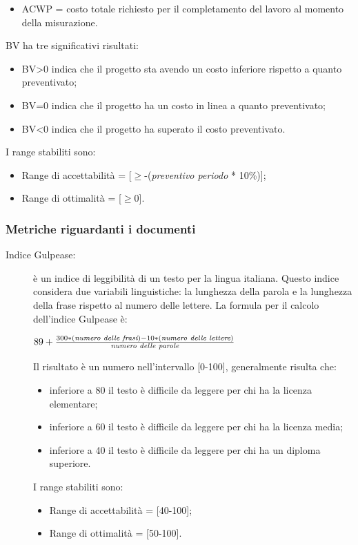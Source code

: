 \begin{description}
\begin{itemize}
        \item ACWP = costo totale richiesto per il completamento del lavoro al momento della misurazione.
      \end{itemize}
      BV ha tre significativi risultati:
      \begin{itemize}
        \item BV>0 indica che il progetto sta avendo un costo inferiore rispetto a quanto preventivato;
        \item BV=0 indica che il progetto ha un costo in linea a quanto preventivato;
        \item BV<0 indica che il progetto ha superato il costo preventivato.
      \end{itemize}
      I range stabiliti sono:
      \begin{itemize}
        \item Range di accettabilità = [\(\geq\)-(\emph{preventivo periodo} * 10\%)];
        \item Range di ottimalità = [\(\geq\)0].
      \end{itemize}
    \end{description}
    \subsubsection{Metriche riguardanti i documenti}
    \begin{description}
      \item[Indice Gulpease:] è un indice di leggibilità di un testo per la lingua italiana.
      Questo indice considera due variabili linguistiche: la lunghezza della parola e la lunghezza della frase rispetto al numero delle lettere.
      La formula per il calcolo dell'indice Gulpease è:
      \begin{center}
        \( 89+\frac{300 * (\emph{numero delle frasi}) - 10 * (\emph{numero delle lettere})}{\emph{numero delle parole}} \)
      \end{center}
      Il risultato è un numero nell'intervallo [0-100], generalmente risulta che:
      \begin{itemize}
        \item inferiore a 80 il testo è difficile da leggere per chi ha la licenza elementare;
        \item inferiore a 60 il testo è difficile da leggere per chi ha la licenza media;
        \item inferiore a 40 il testo è difficile da leggere per chi ha un diploma superiore.
      \end{itemize}
      I range stabiliti sono:
      \begin{itemize}
        \item Range di accettabilità = [40-100];
        \item Range di ottimalità = [50-100].
      \end{itemize}
    \end{description}
